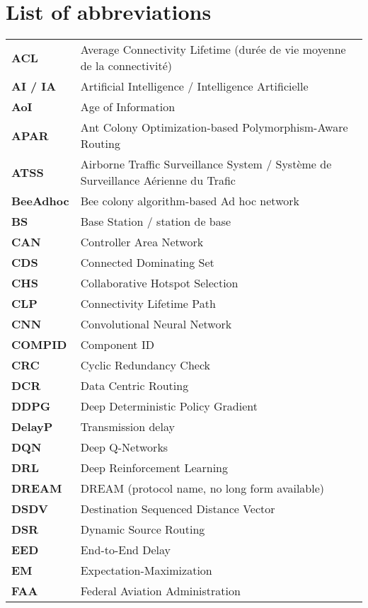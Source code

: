 \chapter*{List of abbreviations}
\label{chap.abbreviations}

\begin{longtable}{p{4cm} p{11cm}}
\textbf{ACL} & Average Connectivity Lifetime (durée de vie moyenne de la connectivité) \\
\textbf{AI / IA} & Artificial Intelligence / Intelligence Artificielle \\
\textbf{AoI} & Age of Information \\
\textbf{APAR} & Ant Colony Optimization-based Polymorphism-Aware Routing \\
\textbf{ATSS} & Airborne Traffic Surveillance System / Système de Surveillance Aérienne du Trafic \\
\textbf{BeeAdhoc} & Bee colony algorithm-based Ad hoc network \\
\textbf{BS} & Base Station / station de base \\
\textbf{CAN} & Controller Area Network \\
\textbf{CDS} & Connected Dominating Set \\
\textbf{CHS} & Collaborative Hotspot Selection \\
\textbf{CLP} & Connectivity Lifetime Path \\
\textbf{CNN} & Convolutional Neural Network \\
\textbf{COMPID} & Component ID \\
\textbf{CRC} & Cyclic Redundancy Check \\
\textbf{DCR} & Data Centric Routing \\
\textbf{DDPG} & Deep Deterministic Policy Gradient \\
\textbf{DelayP} & Transmission delay \\
\textbf{DQN} & Deep Q-Networks \\
\textbf{DRL} & Deep Reinforcement Learning \\
\textbf{DREAM} & DREAM (protocol name, no long form available) \\
\textbf{DSDV} & Destination Sequenced Distance Vector \\
\textbf{DSR} & Dynamic Source Routing \\
\textbf{EED} & End-to-End Delay \\
\textbf{EM} & Expectation-Maximization \\
\textbf{FAA} & Federal Aviation Administration \\

\end{longtable}
